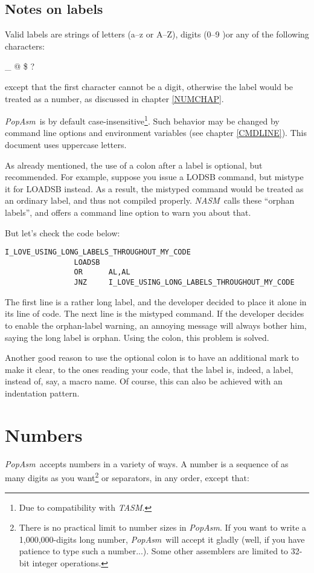 \documentclass[a4paper,12pt]{book}
\newcommand{\popasm}{\emph{PopAsm}}
\newcommand{\nasm}{\emph{NASM}}
\newcommand{\tasm}{\emph{TASM}}
\begin{document}
\section{Notes on labels\label{NOTELABEL}}

Valid labels are strings of letters (a--z or A--Z), digits (0--9 )or any
of the following characters:

\begin{center}
\_ @ \$ ?
\end{center}

\noindent except that the first character cannot be a digit, otherwise the
label would be treated as a number, as discussed in chapter \ref{NUMCHAP}.

\popasm\ is by default case-insensitive\footnote{Due to compatibility with
\tasm.}. Such behavior may be changed by command line options and environment
variables (see chapter \ref{CMDLINE}). This document uses uppercase letters.

As already mentioned, the use of a colon after a label is optional,
but recommended. For example, suppose you issue a LODSB command, but
mistype it for LOADSB instead. As a result, the mistyped command would
be treated as an ordinary label, and thus not compiled properly. \nasm\ 
calls these ``orphan labels'', and offers a command line option to
warn you about that.

But let's check the code below:

\begin{verbatim}
I_LOVE_USING_LONG_LABELS_THROUGHOUT_MY_CODE
                LOADSB
                OR      AL,AL
                JNZ     I_LOVE_USING_LONG_LABELS_THROUGHOUT_MY_CODE
\end{verbatim}

The first line is a rather long label, and the developer decided
to place it alone in its line of code. The next line is the mistyped
command. If the developer decides to enable the orphan-label warning,
an annoying message will always bother him, saying the long label
is orphan. Using the colon, this problem is solved.

Another good reason to use the optional colon is to have an additional
mark to make it clear, to the ones reading your code, that the label is,
indeed, a label, instead of, say, a macro name. Of course, this can
also be achieved with an indentation pattern.

\chapter{Numbers\label{NUMCHAP}}
\popasm\ accepts numbers in a variety of ways. A number is a sequence
of as many digits as you want\footnote{There is no practical limit to
number sizes in \popasm. If you want to write a 1,000,000-digits long
number, \popasm\ will accept it gladly (well, if you have patience to
type such a number...). Some other assemblers are limited to 32-bit
integer operations.} or separators, in any order, except that:
\end{document}
